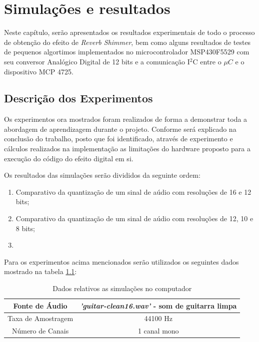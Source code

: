 \chapter{Simulações e resultados}
	Neste capítulo, serão apresentados os resultados experimentais de todo o processo de obtenção do efeito de \textit{Reverb Shimmer}, bem como alguns resultados de testes de pequenos algortimos implementados no microcontrolador MSP430F5529 com seu conversor Analógico Digital de 12 bits e a comunicação I$ ^2 $C entre o $ \mu C $ e o dispositivo MCP 4725.
	
	\section{Descrição dos Experimentos}
	
		Os experimentos ora mostrados foram realizados de forma a demonstrar toda a abordagem de aprendizagem durante o projeto. Conforme será explicado na conclusão do trabalho, posto que foi identificado, através de experimento e cálculos realizados na implementação as limitações do hardware proposto para a execução do código do efeito digital em si.


		Os resultados das simulações serão divididos da seguinte ordem:
		
		\begin{enumerate}
			\item Comparativo da quantização de um sinal de aúdio com resoluções de 16 e 12 bits;
			\item Comparativo da quantização de um sinal de aúdio com resoluções de 12, 10 e 8 bits;
			\item 
		\end{enumerate}
	
		Para os experimentos acima mencionados serão utilizados os seguintes dados mostrado na tabela \ref{tab-exp01}:
		
		\begin{table}[!ht]
			\centering
			\begin{tabular}[ht!]{|c|c|}
				\hline 
				Fonte de Áudio		&	\textit{'guitar-clean16.wav'} - som de guitarra limpa\\
				\hline
				Taxa de Amostragem 	&	44100 Hz	\\
				\hline
				Número de Canais 	&	1 canal mono\\ 
				\hline
			\end{tabular}
			\caption{Dados relativos as simulações no computador}
			\label{tab-exp01}
		\end{table}
		
